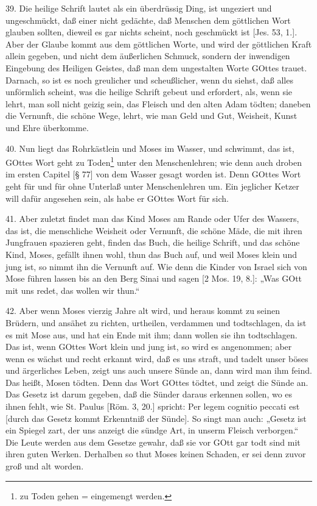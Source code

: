 39. Die heilige Schrift lautet als ein überdrüssig Ding, ist ungeziert und ungeschmückt, daß einer nicht gedächte, daß Menschen dem göttlichen Wort glauben sollten, dieweil es gar nichts scheint, noch geschmückt ist [Jes. 53, 1.]. Aber der Glaube kommt aus dem göttlichen Worte, und wird der göttlichen Kraft allein gegeben, und nicht dem äußerlichen Schmuck, sondern der inwendigen Eingebung des Heiligen Geistes, daß man dem ungestalten Worte GOttes trauet. Darnach, so ist es noch greulicher und scheußlicher, wenn du siehst, daß alles unförmlich scheint, was die heilige Schrift gebeut und erfordert, als, wenn sie lehrt, man soll nicht geizig sein, das Fleisch und den alten Adam tödten; daneben die Vernunft, die schöne Wege, lehrt, wie man Geld und Gut, Weisheit, Kunst und Ehre überkomme.

40. Nun liegt das Rohrkästlein und Moses im Wasser, und schwimmt, das ist, GOttes Wort geht zu Toden\footnote{zu Toden gehen = eingemengt werden.} unter den Menschenlehren; wie denn auch droben im ersten Capitel [§ 77] von dem Wasser gesagt worden ist. Denn GOttes Wort geht für und für ohne Unterlaß unter Menschenlehren um. Ein jeglicher Ketzer will dafür angesehen sein, als habe er GOttes Wort für sich.

41. Aber zuletzt findet man das Kind Moses am Rande oder Ufer des Wassers, das ist, die
menschliche Weisheit oder Vernunft, die schöne Mäde, die mit ihren Jungfrauen spazieren geht, finden das Buch, die heilige Schrift, und das schöne Kind, Moses, gefällt ihnen wohl, thun das Buch auf, und weil Moses klein und jung ist, so nimmt ihn die Vernunft auf. Wie denn die Kinder von Israel sich von Mose führen lassen bis an den Berg Sinai und sagen [2 Mos. 19, 8.]: „Was GOtt mit uns redet, das wollen wir thun.“

42. Aber wenn Moses vierzig Jahre alt wird, und heraus kommt zu seinen Brüdern, und ansähet zu richten, urtheilen, verdammen und todtschlagen, da ist es mit Mose aus, und hat ein Ende mit ihm; dann wollen sie ihn todtschlagen. Das ist, wenn GOttes Wort klein und jung ist, so wird es angenommen; aber wenn es wächst und recht erkannt wird, daß es uns straft, und tadelt unser böses und ärgerliches Leben, zeigt uns auch unsere Sünde an, dann wird man ihm feind. Das heißt, Mosen tödten. Denn das Wort GOttes tödtet, und zeigt die Sünde an. Das Gesetz ist darum gegeben, daß die Sünder daraus erkennen sollen, wo es ihnen fehlt, wie St. Paulus [Röm. 3, 20.] spricht: Per legem cognitio peccati est [durch das Gesetz kommt Erkenntniß der Sünde]. So singt man auch: „Gesetz ist ein Spiegel zart, der uns anzeigt die sündge Art, in unserm Fleisch verborgen.“ Die Leute werden aus dem Gesetze gewahr, daß sie vor GOtt gar todt sind mit ihren guten Werken. Derhalben so thut Moses keinen Schaden, er sei denn zuvor groß und alt worden.

